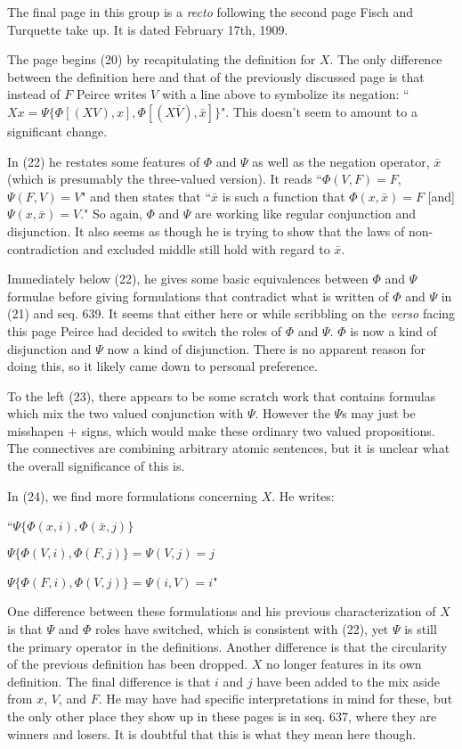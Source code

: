\documentclass[12pt]{article}
\begin{document}
The final page in this group is a \textit{recto} following the second page Fisch and Turquette take up. It is dated February 17th, 1909.

The page begins (20) by recapitulating the definition for $X$. The only difference between the definition here and that of the previously discussed page is that instead of $F$ Peirce writes $V$ with a line above to symbolize its negation: ``$Xx=\Psi\{\Phi[(XV), x], \Phi[(X\bar{V}),\bar{x}]\}$". This doesn't seem to amount to a significant change.

In (22) he restates some features of $\Phi$ and $\Psi$ as well as the negation operator, $\bar{x}$ (which is presumably the three-valued version). It reads ``$\Phi(V,F)=F$, $\Psi(F,V)=V$" and then states that ``$\bar{x}$ is such a function that $\Phi(x,\bar{x})=F$ [and] $\Psi(x, \bar{x})=V$." So again, $\Phi$ and $\Psi$ are working like regular conjunction and disjunction. It also seems as though he is trying to show that the laws of non-contradiction and excluded middle still hold with regard to $\bar{x}$. 

Immediately below (22), he gives some basic equivalences between $\Phi$ and $\Psi$ formulae before giving formulations that contradict what is written of $\Phi$ and $\Psi$ in (21) and seq. 639. It seems that either here or while scribbling on the \textit{verso} facing this page Peirce had decided to switch the roles of $\Phi$ and $\Psi$. $\Phi$ is now a kind of disjunction and $\Psi$ now a kind of disjunction. There is no apparent reason for doing this, so it likely came down to personal preference.

To the left (23), there appears to be some scratch work that contains formulas which mix the two valued conjunction with $\Psi$. However the $\Psi$s may just be misshapen $+$ signs, which would make these ordinary two valued propositions. The connectives are combining arbitrary atomic sentences, but it is unclear what the overall significance of this is.

In (24), we find more formulations concerning $X$. He writes:
\begin{singlespace}
``$\Psi\{\Phi(x, i),\Phi(\bar{x}, j)\}$

$\Psi\{\Phi(V, i),\Phi(F, j)\}=\Psi(V,j)=j$

$\Psi\{\Phi(F, i),\Phi(V, j)\}=\Psi(i,V)=i$"
\end{singlespace}
\noindent One difference between these formulations and his previous characterization of $X$ is that $\Psi$ and $\Phi$ roles have switched, which is consistent with (22), yet $\Psi$ is still the primary operator in the definitions. Another difference is that the circularity of the previous definition has been dropped. $X$ no longer features in its own definition. The final difference is that $i$ and $j$ have been added to the mix aside from $x$, $V$, and $F$. He may have had specific interpretations in mind for these, but the only other place they show up in these pages is in seq. 637, where they are winners and losers. It is doubtful that this is what they mean here though.
\end{document}
